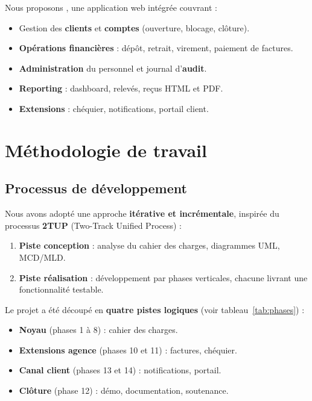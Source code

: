 Nous proposons \textbf{\nomapplication}, une application web intégrée couvrant :
\begin{itemize}[leftmargin=*]
    \item Gestion des \textbf{clients} et \textbf{comptes} (ouverture, blocage, clôture).
    \item \textbf{Opérations financières} : dépôt, retrait, virement, paiement de factures.
    \item \textbf{Administration} du personnel et journal d'\textbf{audit}.
    \item \textbf{Reporting} : dashboard, relevés, reçus HTML et PDF.
    \item \textbf{Extensions} : chéquier, notifications, portail client.
\end{itemize}

\section{Méthodologie de travail}

\subsection{Processus de développement}

Nous avons adopté une approche \textbf{itérative et incrémentale}, inspirée du processus \textbf{2TUP} (Two-Track Unified Process) :
\begin{enumerate}[leftmargin=*]
    \item \textbf{Piste conception} : analyse du cahier des charges, diagrammes UML, MCD/MLD.
    \item \textbf{Piste réalisation} : développement par phases verticales, chacune livrant une fonctionnalité testable.
\end{enumerate}

Le projet a été découpé en \textbf{quatre pistes logiques} (voir tableau~\ref{tab:phases}) :
\begin{itemize}[leftmargin=*]
    \item \textbf{Noyau} (phases 1 à 8) : cahier des charges.
    \item \textbf{Extensions agence} (phases 10 et 11) : factures, chéquier.
    \item \textbf{Canal client} (phases 13 et 14) : notifications, portail.
    \item \textbf{Clôture} (phase 12) : démo, documentation, soutenance.
\end{itemize}

